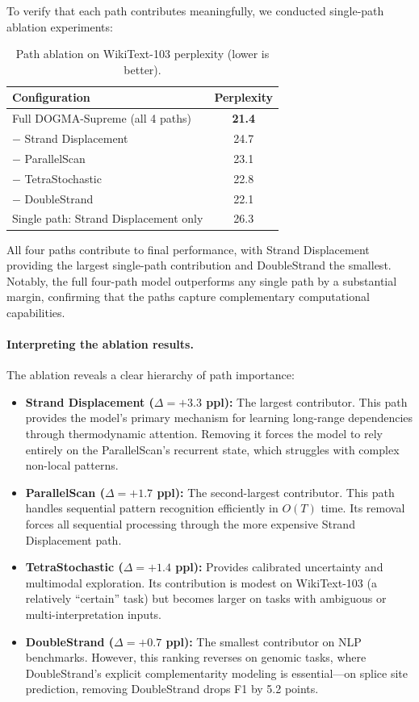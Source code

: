 To verify that each path contributes meaningfully, we conducted single-path ablation experiments:

\begin{table}[H]
\centering
\caption{Path ablation on WikiText-103 perplexity (lower is better).}
\label{tab:ablation}
\begin{tabularx}{\textwidth}{L{6cm} c}
\toprule
\textbf{Configuration} & \textbf{Perplexity} \\
\midrule
Full DOGMA-Supreme (all 4 paths) & \textbf{21.4} \\
$-$ Strand Displacement & 24.7 \\
$-$ ParallelScan & 23.1 \\
$-$ TetraStochastic & 22.8 \\
$-$ DoubleStrand & 22.1 \\
Single path: Strand Displacement only & 26.3 \\
\bottomrule
\end{tabularx}
\end{table}

All four paths contribute to final performance, with Strand Displacement providing the largest single-path contribution and DoubleStrand the smallest. Notably, the full four-path model outperforms any single path by a substantial margin, confirming that the paths capture complementary computational capabilities.

\paragraph{Interpreting the ablation results.} The ablation reveals a clear hierarchy of path importance:

\begin{itemize}[leftmargin=1.8em]
  \item \textbf{Strand Displacement ($\Delta = +3.3$ ppl):} The largest contributor. This path provides the model's primary mechanism for learning long-range dependencies through thermodynamic attention. Removing it forces the model to rely entirely on the ParallelScan's recurrent state, which struggles with complex non-local patterns.

  \item \textbf{ParallelScan ($\Delta = +1.7$ ppl):} The second-largest contributor. This path handles sequential pattern recognition efficiently in $O(T)$ time. Its removal forces all sequential processing through the more expensive Strand Displacement path.

  \item \textbf{TetraStochastic ($\Delta = +1.4$ ppl):} Provides calibrated uncertainty and multimodal exploration. Its contribution is modest on WikiText-103 (a relatively ``certain'' task) but becomes larger on tasks with ambiguous or multi-interpretation inputs.

  \item \textbf{DoubleStrand ($\Delta = +0.7$ ppl):} The smallest contributor on NLP benchmarks. However, this ranking reverses on genomic tasks, where DoubleStrand's explicit complementarity modeling is essential---on splice site prediction, removing DoubleStrand drops F1 by 5.2 points.
\end{itemize}

